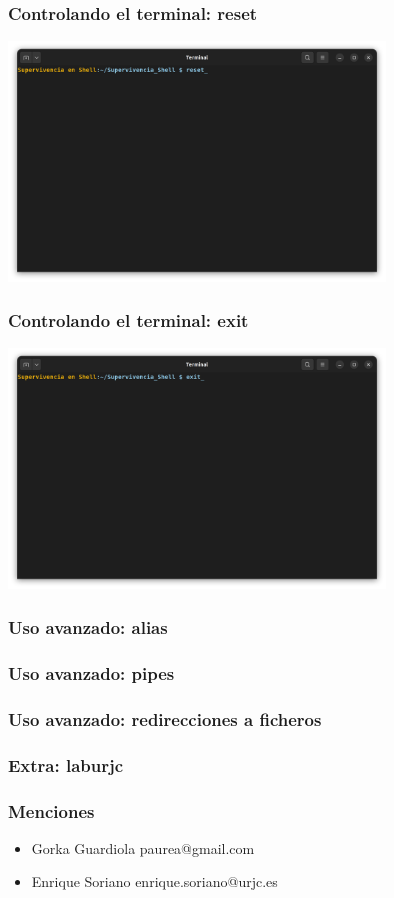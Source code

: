 \documentclass[10pt]{beamer}
\begin{document}
	\begin{frame}
		\frametitle{Controlando el terminal: reset}
		\includegraphics[width=0.75\textwidth]{reset}
	\end{frame}	
	
	\begin{frame}
		\frametitle{Controlando el terminal: exit}
		\includegraphics[width=0.75\textwidth]{exit}
	\end{frame}

	\begin{frame}
		\frametitle{Uso avanzado: alias}
	\end{frame}	

	\begin{frame}
		\frametitle{Uso avanzado: pipes}
	\end{frame}
	
	\begin{frame}
		\frametitle{Uso avanzado: redirecciones a ficheros}
	\end{frame}	
		
	\begin{frame}
		\frametitle{Extra: laburjc}
	\end{frame}
	
	\begin{frame}
		\frametitle{Menciones}
		\begin{itemize}
			\item Gorka Guardiola paurea@gmail.com
			
			\item Enrique Soriano enrique.soriano@urjc.es
		\end{itemize}
	\end{frame}
\end{document}
